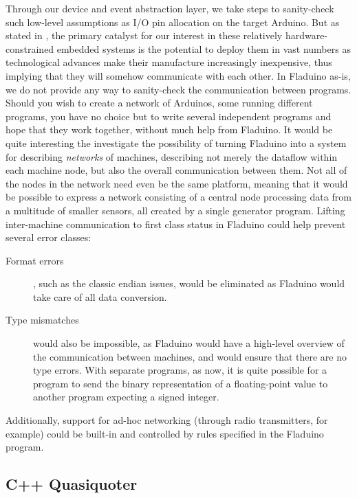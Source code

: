 \documentclass[a4paper, oneside, final]{memoir}
\let\Fref\undefined
\begin{document}
Through our device and event abstraction layer, we take steps to
sanity-check such low-level assumptions as I/O pin allocation on the
target Arduino.  But as stated in \Fref{sec:motivation}, the primary
catalyst for our interest in these relatively hardware-constrained
embedded systems is the potential to deploy them in vast numbers as
technological advances make their manufacture increasingly
inexpensive, thus implying that they will somehow communicate with
each other.  In Fladuino as-is, we do not provide any way to
sanity-check the communication between programs.  Should you wish to
create a network of Arduinos, some running different programs, you
have no choice but to write several independent programs and hope that
they work together, without much help from Fladuino.  It would be
quite interesting the investigate the possibility of turning Fladuino
into a system for describing \textit{networks} of machines, describing
not merely the dataflow within each machine node, but also the overall
communication between them.  Not all of the nodes in the network need
even be the same platform, meaning that it would be possible to
express a network consisting of a central node processing data from a
multitude of smaller sensors, all created by a single generator
program.  Lifting inter-machine communication to first class status in
Fladuino could help prevent several error classes:

\begin{description}
\item[Format errors], such as the classic endian issues, would be
  eliminated as Fladuino would take care of all data conversion.
\item[Type mismatches] would also be impossible, as Fladuino would
  have a high-level overview of the communication between machines,
  and would ensure that there are no type errors.  With separate
  programs, as now, it is quite possible for a program to send the
  binary representation of a floating-point value to another program
  expecting a signed integer.
\end{description}

Additionally, support for ad-hoc networking (through radio
transmitters, for example) could be built-in and controlled by rules
specified in the Fladuino program.

\subsection{C++ Quasiquoter}
\end{document}
